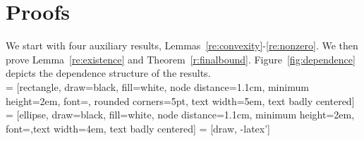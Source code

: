 \documentclass[bj]{imsart}
\newcommand{\1}{{\rm 1}\mskip -4,5mu{\rm l} }
\begin{document}

\pagebreak
\appendix
\section{Proofs}\label{sec:proofs}

We start with four auxiliary results, Lemmas~\ref{re:convexity}-\ref{re:nonzero}. 
We then prove Lemma~\ref{re:existence} and Theorem~\ref{r:finalbound}. Figure~\ref{fig:dependence} depicts the dependence structure of the results.\\

 = [rectangle, draw=black, fill=white, node distance=1.1cm, minimum height=2em, font=\color{black}\sffamily, rounded corners=5pt, text width=5em, text badly centered]
 = [ellipse, draw=black, fill=white, node distance=1.1cm, minimum height=2em, font=\color{black}\sffamily,text width=4em, text badly centered]
 = [draw, -latex']
    
\end{document}
